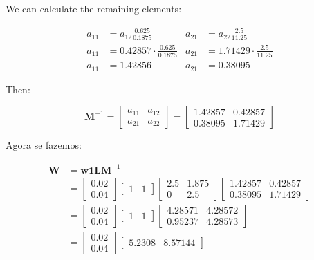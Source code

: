 We can calculate the remaining elements:


\begin{align}
a_{11} & =a_{12}\frac{0.625}{0.1875} & a_{21} & =a_{22}\frac{2.5}{11.25}\\
a_{11} & =0.42857\cdot\frac{0.625}{0.1875} & a_{21} & =1.71429\cdot\frac{2.5}{11.25}\\
a_{11} & =1.42856 & a_{21} & =0.38095
\end{align}

Then:

\begin{equation}
\boldsymbol{M}^{-1}=\left[\begin{array}{cc}
a_{11} & a_{12}\\
a_{21} & a_{22}
\end{array}\right]=\left[\begin{array}{cc}
1.42857 & 0.42857\\
0.38095 & 1.71429
\end{array}\right]
\end{equation}

Agora se fazemos:

\begin{align}
\boldsymbol{W} & =\boldsymbol{w}\boldsymbol{1}\boldsymbol{L}\boldsymbol{M}^{-1}\\
 & =\left[\begin{array}{c}
0.02\\
0.04
\end{array}\right]\left[\begin{array}{cc}
1 & 1\end{array}\right]\left[\begin{array}{cc}
2.5 & 1.875\\
0 & 2.5
\end{array}\right]\left[\begin{array}{cc}
1.42857 & 0.42857\\
0.38095 & 1.71429
\end{array}\right]\\
 & =\left[\begin{array}{c}
0.02\\
0.04
\end{array}\right]\left[\begin{array}{cc}
1 & 1\end{array}\right]\left[\begin{array}{cc}
4.28571 & 4.28572\\
0.95237 & 4.28573
\end{array}\right]\\
 & =\left[\begin{array}{c}
0.02\\
0.04
\end{array}\right]\left[\begin{array}{cc}
5.2308 & 8.57144\end{array}\right]
\end{align}

